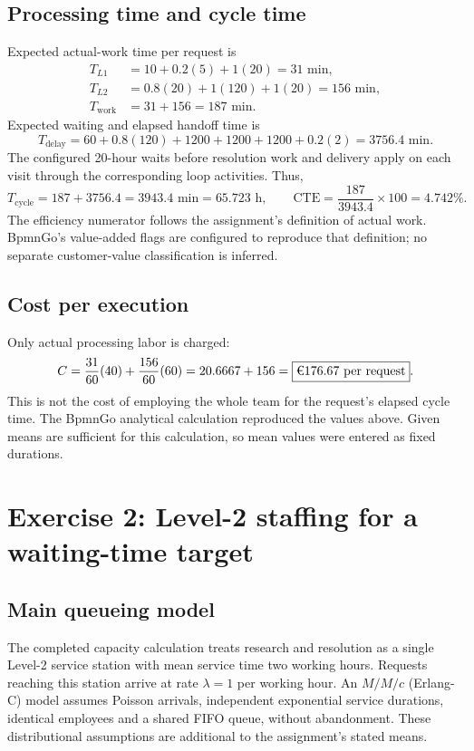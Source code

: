 \documentclass[10pt,a4paper]{article}
\newcommand{\EUR}{\texteuro}
\begin{document}
\subsection{Processing time and cycle time}
Expected actual-work time per request is
\begin{align*}
 T_{L1} &= 10+0.2(5)+1(20)=31\text{ min},\\
 T_{L2} &= 0.8(20)+1(120)+1(20)=156\text{ min},\\
 T_{\mathrm{work}} &=31+156=187\text{ min}.
\end{align*}
Expected waiting and elapsed handoff time is
\[
 T_{\mathrm{delay}}=60+0.8(120)+1200+1200+1200+0.2(2)
 =3756.4\text{ min}.
\]
The configured 20-hour waits before resolution work and delivery apply on each
visit through the corresponding loop activities. Thus,
\[
 T_{\mathrm{cycle}}=187+3756.4=3943.4\text{ min}=65.723\text{ h},
 \qquad
 \mathrm{CTE}=\frac{187}{3943.4}\times100=\boxed{4.742\%}.
\]
The efficiency numerator follows the assignment's definition of actual work.
BpmnGo's value-added flags are configured to reproduce that definition; no separate
customer-value classification is inferred.

\subsection{Cost per execution}
Only actual processing labor is charged:
\[
 C=\frac{31}{60}(40)+\frac{156}{60}(60)
   =20.6667+156=\boxed{\text{\EUR176.67 per request}}.
\]
This is not the cost of employing the whole team for the request's elapsed cycle
time. The BpmnGo analytical calculation reproduced the values above. Given means
are sufficient for this calculation, so mean values were entered as fixed durations.

\section{Exercise 2: Level-2 staffing for a waiting-time target}
\subsection{Main queueing model}
The completed capacity calculation treats research and resolution as a single
Level-2 service station with mean service time two working hours. Requests reaching
this station arrive at rate $\lambda=1$ per working hour. An $M/M/c$ (Erlang-C)
model assumes Poisson arrivals, independent exponential service durations, identical
employees and a shared FIFO queue, without abandonment. These distributional
assumptions are additional to the assignment's stated means.
\end{document}
